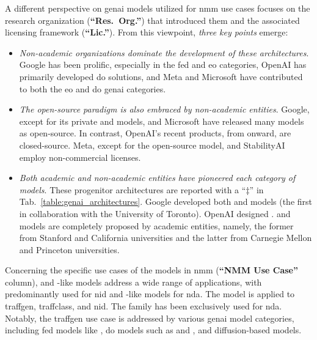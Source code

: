 A different perspective on \gls{genai} models utilized for \gls{nmm} use cases focuses on the research organization (\textbf{``Res.~Org.''}) that introduced them and the associated licensing framework (\textbf{``Lic.''}).
From this viewpoint, \emph{three key points} emerge:
\begin{itemize}
    \item \textit{Non-academic organizations dominate the development of these architectures}. 
    Google has been prolific, especially in the \gls{fed} and \gls{eo} categories, OpenAI has primarily developed \gls{do} solutions, and Meta and Microsoft have contributed to both the \gls{eo} and \gls{do} \gls{genai} categories.

    
    \item \textit{The open-source paradigm is also embraced by non-academic entities}. 
    Google, except for its private  and  models, and Microsoft have released many models as open-source. In contrast, OpenAI's recent products, from  onward, are closed-source. Meta, except for the open-source  model, and StabilityAI employ non-commercial licenses.    




    
    \item  \textit{Both academic and non-academic entities have pioneered each category of models}. These progenitor architectures are reported with a  ``$\ddag$'' in Tab.~\ref{table:genai_architectures}.
    Google developed both  and  models (the first in collaboration with the University of Toronto). OpenAI designed .  and  models are completely proposed by academic entities, namely, the former from Stanford and California universities and the latter from Carnegie Mellon and Princeton universities.




    
\end{itemize}




Concerning the specific use cases of the models in \gls{nmm} (\textbf{``NMM Use Case''} column),
 and -like models address a wide range of applications, with  predominantly used for \gls{nid} and -like models for \gls{nda}. The  model is applied to \gls{traffgen}, \gls{traffclass}, and \gls{nid}.
The  family has been exclusively used for \gls{nda}.
Notably, the \gls{traffgen} use case is addressed by various \gls{genai} model categories,
including \gls{fed} models like ,
\gls{do} models such as   and , 
and diffusion-based models.

